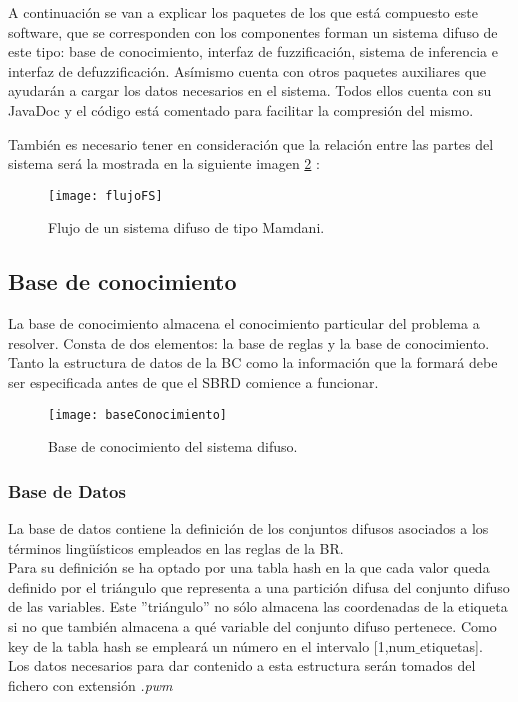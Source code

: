 \documentclass[12pt,a4paper]{article}
\begin{document}
A continuación se van a explicar los paquetes de los que está compuesto este software, que se corresponden con los componentes forman un sistema difuso de este tipo: base de conocimiento, interfaz de fuzzificación, sistema de inferencia e interfaz de defuzzificación. Asímismo cuenta con otros paquetes auxiliares que ayudarán a cargar los datos necesarios en el sistema. Todos ellos cuenta con su JavaDoc y el código está comentado para facilitar la compresión del mismo.

También es necesario tener en consideración que la relación entre las partes del sistema será la mostrada en la siguiente imagen \ref{flujoFS} :
\begin{figure}[H]
\centering
\texttt{[image: flujoFS]}
\caption{Flujo de un sistema difuso de tipo Mamdani.}
\label{flujoFS}
\end{figure}

\subsection{Base de conocimiento}
La base de conocimiento almacena el conocimiento particular del problema a resolver. Consta de dos elementos: la base de reglas y la base de conocimiento. Tanto la estructura de datos de la BC como la información que la formará debe ser especificada antes de que el SBRD comience a funcionar.

\begin{figure}[H]
\centering
\texttt{[image: baseConocimiento]}
\caption{Base de conocimiento del sistema difuso.}
\label{flujoFS}
\end{figure}

\subsubsection{Base de Datos}
La base de datos contiene la definición de los conjuntos difusos asociados a los términos lingüísticos empleados en las reglas de la BR.\\
Para su definición se ha optado por una tabla hash en la que cada valor queda definido por el triángulo que representa a una partición difusa del conjunto difuso de las variables. Este ''triángulo'' no sólo almacena las coordenadas de la etiqueta si no que también almacena a qué variable del conjunto difuso pertenece. Como key de la tabla hash se empleará un número en el intervalo [1,num$\_$etiquetas].\\
Los datos necesarios para dar contenido a esta estructura serán tomados del fichero con extensión \textit{.pwm}
\end{document}
